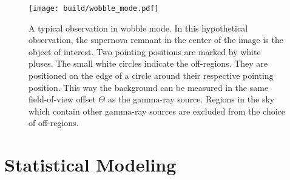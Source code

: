 \begin{figure}
  \centering
  \texttt{[image: build/wobble\_mode.pdf]}
  \caption[Depiction of wobble mod observations.]{A typical observation in wobble mode. In this hypothetical observation, the supernova remnant in the center of the image is the object of interest.
  Two pointing positions are marked by white pluses. The small white circles indicate the off-regions. They are positioned on the edge of a circle around their respective pointing 
  position. This way the background can be measured in the same field-of-view offset $\Theta$ as the gamma-ray source. Regions in the sky which contain other gamma-ray sources 
  are excluded from the choice of off-regions.}
  \label{fig:wobble}
\end{figure}


\section{Statistical Modeling}
\label{sec:stats_model}

